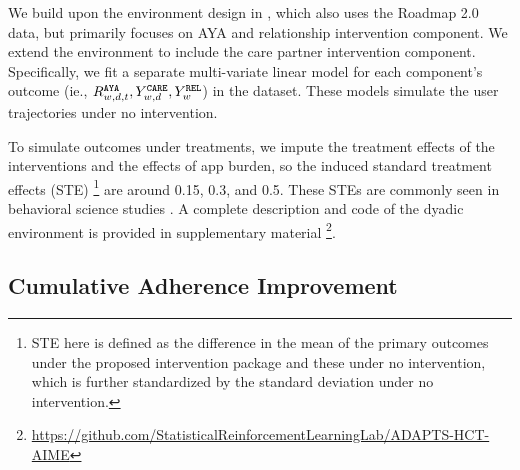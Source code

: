 We build upon the environment design in \cite{li2023dyadic}, which also uses the Roadmap 2.0 data, but primarily focuses on AYA and relationship intervention component. We extend the environment to include the care partner intervention component. Specifically, we fit a separate multi-variate linear model for each component's outcome (ie., $R_{w,d,t}^{\tiny\texttt{AYA}}, Y_{w,d}^{\tiny\texttt{CARE}}, Y_w^{\tiny\texttt{REL}}$) in the dataset. These models simulate the user trajectories under no intervention. 



To simulate outcomes under treatments, we impute the treatment effects of the interventions and the effects of app burden, so the induced standard treatment effects (STE) \footnote{STE here is defined as the difference in the mean of the primary outcomes under the proposed intervention package and these under no intervention, which is further standardized by the standard deviation under no intervention. } are around 0.15, 0.3, and 0.5. These STEs are commonly seen in behavioral science studies \cite{cohen2013statistical}. A complete description and code of the dyadic environment is provided in supplementary material \footnote{\url{https://github.com/StatisticalReinforcementLearningLab/ADAPTS-HCT-AIME}}. 




\subsection{Cumulative Adherence Improvement}

